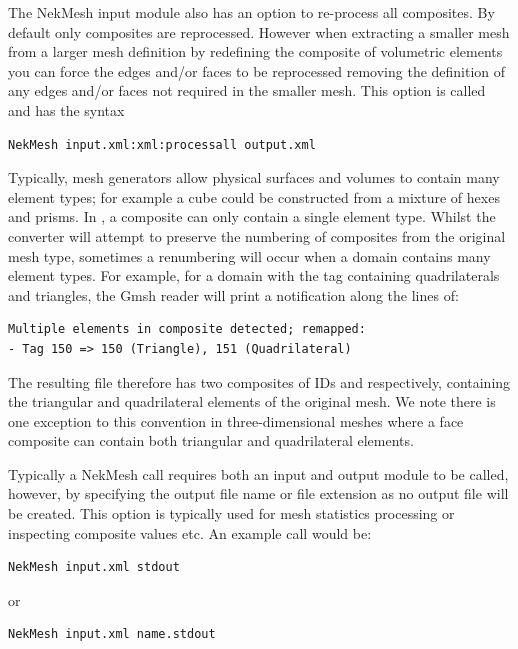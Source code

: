 The NekMesh input module also has an option to re-process all
composites. By default only composites are reprocessed. However when
extracting a smaller mesh from a larger mesh definition by redefining
the composite of volumetric elements you can force the edges and/or
faces to be reprocessed removing the definition of any edges and/or
faces not required in the smaller mesh. This option is called
 and has the syntax

\begin{lstlisting}[style=BashInputStyle]
NekMesh input.xml:xml:processall output.xml 
\end{lstlisting}

Typically, mesh generators allow physical surfaces and volumes to contain many
element types; for example a cube could be constructed from a mixture of hexes
and prisms. In \nekpp, a composite can only contain a single element
type. Whilst the converter will attempt to preserve the numbering of composites
from the original mesh type, sometimes a renumbering will occur when a domain
contains many element types. For example, for a domain with the tag 
containing quadrilaterals and triangles, the Gmsh reader will print a
notification along the lines of:

\begin{lstlisting}[style=BashInputStyle]
Multiple elements in composite detected; remapped:
- Tag 150 => 150 (Triangle), 151 (Quadrilateral)
\end{lstlisting}

The resulting file therefore has two composites of IDs  and
 respectively, containing the triangular and quadrilateral
elements of the original mesh. We note there is one exception to this
convention in three-dimensional meshes where a face composite can
contain both triangular and quadrilateral elements.

Typically a NekMesh call requires both an input and output module to be
called, however, by specifying the output file name or file extension
as  no output file will be created. This option is typically
used for mesh statistics processing or inspecting composite values etc.
An example call would be:

\begin{lstlisting}[style=BashInputStyle]
  NekMesh input.xml stdout
\end{lstlisting}

or 

\begin{lstlisting}[style=BashInputStyle]
  NekMesh input.xml name.stdout
\end{lstlisting}


